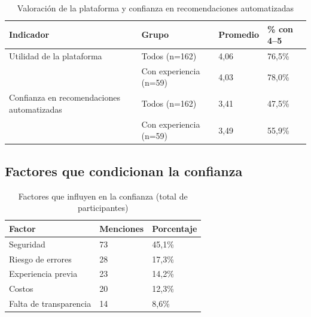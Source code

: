 \begin{table}[H]
\centering
\scriptsize
\label{tab:enc-valoracion}
\begin{tabular}{|p{5cm}|p{3.5cm}|p{2cm}|p{2.5cm}|}
\hline
\textbf{Indicador} & \textbf{Grupo} & \textbf{Promedio} & \textbf{\% con 4--5} \\
\hline
Utilidad de la plataforma & Todos (n=162) & 4,06 & 76,5\% \\
& Con experiencia (n=59) & 4,03 & 78,0\% \\
\hline
Confianza en recomendaciones automatizadas & Todos (n=162) & 3,41 & 47,5\% \\
& Con experiencia (n=59) & 3,49 & 55,9\% \\
\hline
\end{tabular}
\caption{Valoración de la plataforma y confianza en recomendaciones automatizadas}
\end{table}

\subsection{Factores que condicionan la confianza}

\begin{table}[H]
\centering
\scriptsize
\label{tab:enc-factores}
\begin{tabular}{|p{6cm}|p{2cm}|p{3cm}|}
\hline
\textbf{Factor} & \textbf{Menciones} & \textbf{Porcentaje} \\
\hline
Seguridad & 73 & 45,1\% \\
Riesgo de errores & 28 & 17,3\% \\
Experiencia previa & 23 & 14,2\% \\
Costos & 20 & 12,3\% \\
Falta de transparencia & 14 & 8,6\% \\
\hline
\end{tabular}
\caption{Factores que influyen en la confianza (total de participantes)}
\end{table}
